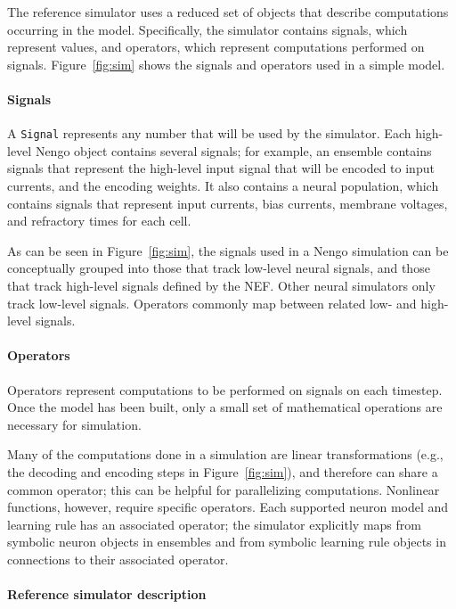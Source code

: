 \documentclass{frontiersSCNS}
\begin{document}
The reference simulator
uses a reduced set of objects
that describe computations
occurring in the model.
Specifically, the simulator
contains signals, which represent values,
and operators, which represent computations
performed on signals.
Figure~\ref{fig:sim} shows the signals
and operators used in a simple model.

\clearpage

\paragraph{Signals}

A \texttt{Signal} represents any number that
will be used by the simulator.
Each high-level Nengo object contains
several signals;
for example, an ensemble contains signals
that represent the high-level input
signal that will be encoded
to input currents,
and the encoding weights.
It also contains a neural population,
which contains signals that represent
input currents, bias currents,
membrane voltages, and refractory times for each cell.

As can be seen in Figure~\ref{fig:sim},
the signals used in a Nengo simulation
can be conceptually grouped into
those that track low-level neural signals,
and those that track high-level signals
defined by the NEF.
Other neural simulators only track
low-level signals.
Operators commonly map
between related low- and high-level signals.

\paragraph{Operators}

Operators represent computations
to be performed on signals on each timestep.
Once the model has been built,
only a small set of mathematical
operations are necessary for simulation.

Many of the computations
done in a simulation
are linear transformations (e.g.,
the decoding and encoding steps
in Figure~\ref{fig:sim}),
and therefore can share a common operator;
this can be helpful for parallelizing computations.
Nonlinear functions, however,
require specific operators.
Each supported neuron model and learning rule
has an associated operator;
the simulator explicitly maps
from symbolic neuron objects in ensembles
and from symbolic learning rule objects
in connections to their associated operator.

\paragraph{Reference simulator description}
\end{document}
